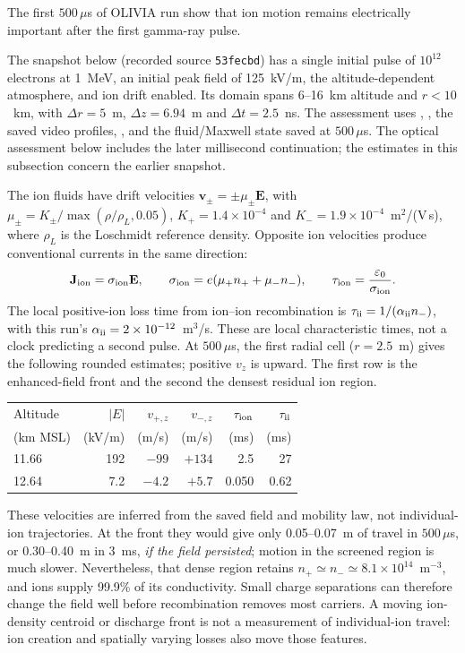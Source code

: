 \documentclass[11pt]{article}
\begin{document}
The first $500\,\mu$s of OLIVIA run  show that ion
motion remains electrically important after the first gamma-ray pulse.

The snapshot below (recorded source \texttt{53fecbd}) has
a single initial pulse of $10^{12}$ electrons at 1~MeV, an initial peak field
of 125~kV/m, the altitude-dependent atmosphere, and ion drift enabled. Its
domain spans 6--16~km altitude and $r<10$~km, with
$\Delta r=5$~m, $\Delta z=6.94$~m and $\Delta t=2.5$~ns. The assessment uses
, , the saved video profiles,
, and the fluid/Maxwell state saved
at $500\,\mu$s. The optical assessment below includes the later millisecond
continuation; the estimates in this subsection concern the earlier snapshot.

The ion fluids have drift velocities $\mathbf v_\pm=\pm\mu_\pm\mathbf E$,
with $\mu_\pm=K_\pm/\max(\rho/\rho_L,0.05)$,
$K_+=1.4\times10^{-4}$ and $K_-=1.9\times10^{-4}$~m$^2$/(V\,s), where
$\rho_L$ is the Loschmidt reference density. Opposite ion velocities produce
conventional currents in the same direction:
\[
 \mathbf J_{\rm ion}=\sigma_{\rm ion}\mathbf E,\qquad
 \sigma_{\rm ion}=e(\mu_+n_++\mu_-n_-),\qquad
 \tau_{\rm ion}=\frac{\varepsilon_0}{\sigma_{\rm ion}}.
\]
The local positive-ion loss time from ion--ion recombination is
$\tau_{\rm ii}=1/(\alpha_{\rm ii}n_-)$, with this run's
$\alpha_{\rm ii}=2\times10^{-12}$~m$^3$/s. These are local characteristic
times, not a clock predicting a second pulse. At $500\,\mu$s, the first
radial cell ($r=2.5$~m) gives the following rounded estimates; positive $v_z$
is upward. The first row is the enhanced-field front and the second the
densest residual ion region.

\begin{center}
\small
\begin{tabular}{@{}lrrrrr@{}}
\toprule
Altitude & $|E|$ & $v_{+,z}$ & $v_{-,z}$ & $\tau_{\rm ion}$ & $\tau_{\rm ii}$ \\
(km MSL) & (kV/m) & (m/s) & (m/s) & (ms) & (ms) \\
\midrule
11.66 & 192 & $-99$ & $+134$ & 2.5 & 27 \\
12.64 & 7.2 & $-4.2$ & $+5.7$ & 0.050 & 0.62 \\
\bottomrule
\end{tabular}
\end{center}

These velocities are inferred from the saved field and mobility law, not
individual-ion trajectories. At the front they would give only 0.05--0.07~m
of travel in $500\,\mu$s, or 0.30--0.40~m in 3~ms, \emph{if the field
persisted}; motion in the screened region is much slower. Nevertheless,
that dense region retains $n_+\simeq n_-\simeq8.1\times10^{14}$~m$^{-3}$,
and ions supply 99.9\% of its conductivity. Small charge separations can
therefore change the field well before recombination removes most carriers.
A moving ion-density centroid or discharge front is not a measurement of
individual-ion travel: ion creation and spatially varying losses also move
those features.
\end{document}
